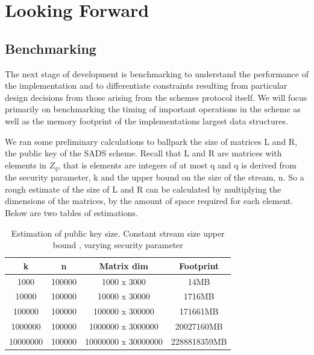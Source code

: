 \documentclass[11pt, letterpaper, oneside]{article}
\begin{document}


\section{Looking Forward}

	\subsection{ Benchmarking }
	
	The next stage of development is benchmarking to understand the performance of the implementation and to differentiate constraints resulting from particular design decisions from those arising from the schemes protocol itself.
	We will focus primarily on benchmarking the timing of important operations in the scheme as well as the memory footprint of the implementations largest data structures.
	
	We ran some preliminary calculations to ballpark the size of matrices L and R, the public key of the SADS scheme.
	Recall that L and R are matrices with elements in $Z_q$, that is elements are integers of at most q and q is derived from the security parameter, k and the upper bound on the size of the stream, n.
	So a rough estimate of the size of L and R can be calculated by multiplying the dimensions of the matrices, by the amount of space required for each element.
	Below are two tables of estimations.
	
	\begin{table}[h]
	\centering
	
		\begin{tabular} { c | c | c | c}
		
		k & n & Matrix dim & Footprint\\ \hline
		1000&100000&1000 x 3000&14MB\\
		10000&100000&10000 x 30000&1716MB\\
		100000&100000&100000 x 300000&171661MB\\
		1000000&100000&1000000 x 3000000&20027160MB\\
		10000000&100000&10000000 x 30000000&2288818359MB\\	
		\end{tabular}
	
	\caption{Estimation of public key size.  Constant stream size upper bound , varying security parameter } 
	\label{tab:pub-key_k}
	\end{table}
	
\end{document}

